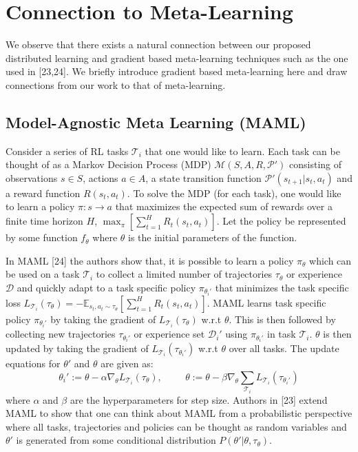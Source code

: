 \documentclass{article}
\begin{document}
\section{Connection to Meta-Learning}
We observe that there exists a natural connection between our proposed distributed learning and gradient based meta-learning techniques such as the one used in [23,24]. We briefly introduce gradient based meta-learning here and draw connections from our work to that of meta-learning.

\subsection{Model-Agnostic Meta Learning (MAML)}
Consider a series of RL tasks $\mathcal{T}_{i}$ that one would like to learn. Each task can be thought of as a Markov Decision Process (MDP) $\mathcal{M} (S,A,R,\mathcal{P}')$ consisting of observations $s \in S$, actions $a \in A$, a state transition function $\mathcal{P}'(s_{t+1}|s_t,a_t)$ and a reward function $R(s_t,a_t)$. To solve the MDP (for each task), one would like to learn a policy $\pi: s \rightarrow a$ that maximizes the expected sum of rewards over a finite time horizon $H$, $\max_{\pi} [\sum_{t=1}^H R_t (s_t,a_t)]$. Let the policy be represented by some function $f_{\theta}$ where $\theta$ is the initial parameters of the function. 

In MAML [24] the authors show that, it is possible to learn a policy $\pi_{\theta}$ which can be used on a task $\mathcal{T}_i$ to collect a limited number of trajectories $\mathcal{\tau}_{\theta}$ or experience $\mathcal{D}$ and quickly adapt to a task specific policy $\pi_{\theta_i '}$ that minimizes the task specific loss $ L_{\mathcal{T}_i} (\tau_{\theta}) = -\mathbb{E}_{s_t, a_t \sim \tau_{\theta} }  [\sum_{t=1}^H R_t(s_t,a_t)]$. MAML learns task specific policy $\pi_{\theta_i '}$ by taking the gradient of $L_{\mathcal{T}_i} (\tau_{\theta})$ w.r.t $\theta$. This is then followed by collecting new trajectories $\mathcal{\tau}_{\theta_i '}$ or experience set $\mathcal{D}_{i}'$ using $\pi_{\theta_i '}$ in task $\mathcal{T}_i$. $\theta$ is then updated by taking the gradient of $L_{\mathcal{T}_i} (\tau_{\theta_i '})$ w.r.t $\theta$ over all tasks. The update equations for $\theta'$ and $\theta$ are given as:
\begin{equation}
\theta_i':= \theta - \alpha \nabla_{\theta} L_{\mathcal{T}_i} (\tau_{\theta}), \hspace{1cm} \theta:=\theta - \beta \nabla_{\theta} \sum_{\mathcal{T}_i} L_{\mathcal{T}_i} (\tau_{\theta_i '}) 
\end{equation}
where $\alpha$ and $\beta$ are the hyperparameters for step size. Authors in [23] extend MAML to show that one can think about MAML from a probabilistic perspective where all tasks, trajectories and policies can be thought as random variables and $\theta '$ is generated from some conditional distribution $P(\theta'| \theta, \tau_{\theta})$. 
\end{document}
